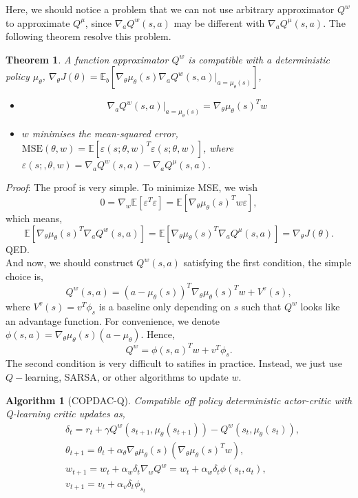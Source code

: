 \documentclass[11pt,a4paper]{article}
\def\epsilon{\varepsilon}
\def\E{\mathbb{E}}
\newtheorem{theorem}{Theorem}[subsection]
\newtheorem{algorithm}{Algorithm}[subsection]
\begin{document}
Here, we should notice a problem that we can not use arbitrary approximator $Q^w$ to approximate $Q^{\mu}$, since $\nabla_{a}Q^w(s,a)$ may be different with $\nabla_a Q^{\mu}(s,a)$. The following theorem resolve this problem.
\begin{theorem}
A function approximator $Q^w$ is compatible with a deterministic policy $\mu_\theta$, $\nabla_\theta J(\theta) = \E_b[\nabla_\theta \mu_\theta(s)\nabla_a Q^w(s,a)|_{a=\mu_{\theta}(s)}]$,
\begin{itemize}
\item 
\begin{equation}
\nabla_a Q^w(s,a)|_{a=\mu_{\theta}(s)} = \nabla_{\theta}\mu_{\theta}(s)^T w
\end{equation}
\item 
$w$ minimises the mean-squared error, $\mathrm{MSE}(\theta,w)=\E[\epsilon(s;\theta,w)^T\epsilon(s;\theta,w)]$, where $\epsilon(s;,\theta,w) = \nabla_a Q^w(s,a) -\nabla_a Q^{\mu}(s,a)$.
\end{itemize}
\end{theorem}
\emph{Proof}:
The proof is very simple. To minimize MSE, we wish
\begin{equation}
0 = \nabla_w \E[\epsilon^T\epsilon] = \E[\nabla_{\theta}\mu_{\theta}(s)^Tw \epsilon],
\end{equation}
which means,
\begin{equation}
\E[\nabla_{\theta}\mu_{\theta}(s)^T\nabla_a Q^w(s,a)] = \E[\nabla_{\theta}\mu_{\theta}(s)^T \nabla_a Q^{\mu}(s,a)] = \nabla_\theta J(\theta).
\end{equation}
QED. \\ 
And now, we should construct $Q^w(s,a)$ satisfying the first condition, the simple choice is,
\begin{equation}
Q^w(s,a) = (a-\mu_{\theta}(s))^T\nabla_{\theta}\mu_\theta(s)^Tw + V^v(s),
\end{equation}
where $V^v(s) = v^T\phi_s$ is a baseline only depending on $s$ such that $Q^w$ looks like an advantage function. For convenience, we denote $\phi(s,a) = \nabla_{\theta}\mu_{\theta}(s)(a-\mu_{\theta})$. Hence, 
\begin{equation}
Q^w = \phi(s,a)^T w + v^T \phi_s.
\end{equation}
The second condition is very difficult to satifies in practice. Instead, we just use $Q-$learning, SARSA, or other algorithms to update $w$.
\begin{algorithm}[COPDAC-Q]
Compatible off policy deterministic actor-critic with Q-learning critic updates as,
\begin{align}
& \delta_t = r_t + \gamma Q^w(s_{t+1},\mu_{\theta}(s_{t+1}))-Q^w(s_t,\mu_{\theta}(s_t)), \\ 
& \theta_{t+1} = \theta_t + \alpha_{\theta} \nabla_{\theta}\mu_{\theta}(s)(\nabla_{\theta}\mu_{\theta}(s)^Tw), \\ 
& w_{t+1} = w_t + \alpha_w \delta_t \nabla_w Q^w = w_t + \alpha_w \delta_t \phi(s_t,a_t), \\
& v_{t+1} = v_t + \alpha_v \delta_t \phi_{s_t}
\end{align}
\end{algorithm}
\end{document}
